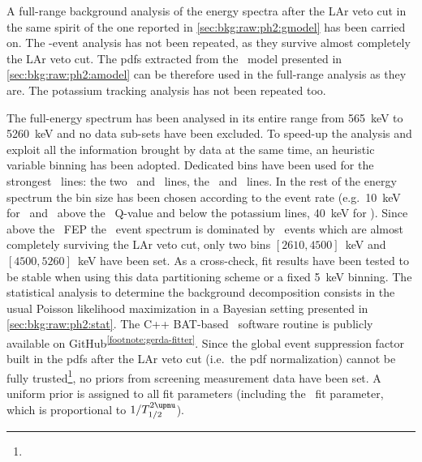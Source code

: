 A full-range background analysis of the energy spectra after the LAr veto cut in the same
spirit of the one reported in \cref{sec:bkg:raw:ph2:gmodel} has been carried on. The
\a-event analysis has not been repeated, as they survive almost completely the LAr veto
cut.  The pdfs extracted from the \a\ model presented in \cref{sec:bkg:raw:ph2:amodel} can
be therefore used in the full-range analysis as they are. The potassium tracking analysis
has not been repeated too.

The full-energy spectrum has been analysed in its entire range from 565~keV to 5260~keV
and no data sub-sets have been excluded. To speed-up the analysis and exploit all the
information brought by data at the same time, an heuristic variable binning has been
adopted. Dedicated bins have been used for the strongest \g\ lines: the two \kvn\ and
\kvz\ lines, the \Bih\ and \Tl\ lines. In the rest of the energy spectrum the bin size has
been chosen according to the event rate (e.g.~10~keV for \enrBEGeII\ and \enrCoaxII\ above
the \Arl\ Q-value and below the potassium lines, 40~keV for \enrGeII). Since above the
\Tl\ FEP the \Mone\ event spectrum is dominated by \a\ events which are almost completely
surviving the LAr veto cut, only two bins $[2610, 4500]$~keV and $[4500, 5260]$~keV have
been set. As a cross-check, fit results have been tested to be stable when using this
data partitioning scheme or a fixed 5~keV binning.
\newpar
The statistical analysis to determine the background decomposition consists in the usual
Poisson likelihood maximization in a Bayesian setting presented in
\cref{sec:bkg:raw:ph2:stat}. The C++ BAT-based~\cite{Caldwell2008} software routine is
publicly available on GitHub\textsuperscript{\ref{footnote:gerda-fitter}}. Since the
global event suppression factor built in the pdfs after the LAr veto cut (i.e.~the pdf
normalization) cannot be fully trusted\footnote{%
}, no priors from screening measurement data have been set. A uniform prior is assigned to
all fit parameters (including the \nnbb\ fit parameter, which is proportional to
$1/\thalftwoM$).

